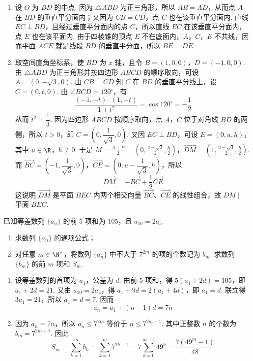 \begin{solution}
\begin{enumerate}
\item 设 \(O\) 为 \(BD\) 的中点. 因为 \(\triangle ABD\) 为正三角形，所以 \(AB=AD\)，从而点 \(A\) 在 \(BD\) 的垂直平分面内；又因为 \(CB=CD\)，点 \(C\) 也在该垂直平分面内. 直线 \(EC\perp BD\)，且经过垂直平分面内的点 \(C\)，所以直线 \(EC\) 在该垂直平分面内，点 \(E\) 也在该平面内. 由于四棱锥的顶点 \(E\) 不在底面内，\(A\)，\(C\)，\(E\) 不共线，因而平面 \(ACE\) 就是线段 \(BD\) 的垂直平分面，所以 \(BE=DE\).
\item 取空间直角坐标系，使 \(BD\) 为 \(x\) 轴，且令 \(B=(1,0,0)\)，\(D=(-1,0,0)\). 由 \(\triangle ABD\) 为正三角形并按四边形 \(ABCD\) 的顺序取向，可设 \(A=(0,-\sqrt3,0)\). 由 \(CB=CD\) 知 \(C\) 在 \(BD\) 的垂直平分线上，设 \(C=(0,t,0)\). 由 \(\angle BCD=120^{\circ}\)，有
\[
\frac{(-1,-t)\cdot(1,-t)}{1+t^2}=\cos120^{\circ}=-\frac12
\]
从而 \(t^2=\dfrac13\). 因为四边形 \(ABCD\) 按顺序取向，点 \(A\)，\(C\) 位于对角线 \(BD\) 的两侧，所以 \(t>0\)，即 \(C=\left(0,\dfrac1{\sqrt3},0\right)\). 又因 \(EC\perp BD\)，可设 \(E=(0,u,h)\)，其中 \(u\in\R\)，\(h\neq0\). 于是
\(M=\frac{A+E}{2}=\left(0,\frac{u-\sqrt3}{2},\frac h2\right)\)，\(\overrightarrow{DM}=\left(1,\frac{u-\sqrt3}{2},\frac h2\right)\).
而 \(\overrightarrow{BC}=\left(-1,\dfrac1{\sqrt3},0\right)\)，\(\overrightarrow{CE}=\left(0,u-\dfrac1{\sqrt3},h\right)\)，所以
\[
\overrightarrow{DM}=-\overrightarrow{BC}+\frac12\overrightarrow{CE}
\]
这说明 \(\overrightarrow{DM}\) 是平面 \(BEC\) 内两个相交向量 \(\overrightarrow{BC}\)、\(\overrightarrow{CE}\) 的线性组合，故 \(DM\parallel\) 平面 \(BEC\).
\end{enumerate}
\end{solution}

\begin{problem}
已知等差数列 \(\{a_n\}\) 的前 5 项和为 105，且 \(a_{10}=2a_5\).
\begin{enumerate}
\item 求数列 \(\{a_n\}\) 的通项公式；
\item 对任意 \(m\in\N^*\)，将数列 \(\{a_n\}\) 中不大于 \(7^{2m}\) 的项的个数记为 \(b_m\). 求数列 \(\{b_m\}\) 的前 \(m\) 项和 \(S_m\).
\end{enumerate}
\end{problem}

\begin{solution}
\begin{enumerate}
\item 设等差数列的首项为 \(a_1\)，公差为 \(d\). 由前 5 项和，得 \(5(a_1+2d)=105\)，即 \(a_1+2d=21\). 又由 \(a_{10}=2a_5\)，得 \(a_1+9d=2(a_1+4d)\)，即 \(a_1=d\). 联立得 \(3a_1=21\)，所以 \(a_1=d=7\). 因而
\[
a_n=a_1+(n-1)d=7n
\]
\item 因为 \(a_n=7n\)，所以 \(a_n\leqslant7^{2m}\) 等价于 \(n\leqslant7^{2m-1}\). 其中正整数 \(n\) 的个数为 \(b_m=7^{2m-1}\). 因此
\[
S_m=\sum_{k=1}^m b_k=\sum_{k=1}^m7^{2k-1}=7\sum_{k=0}^{m-1}49^k=\frac{7(49^m-1)}{48}
\]
\end{enumerate}
\end{solution}

